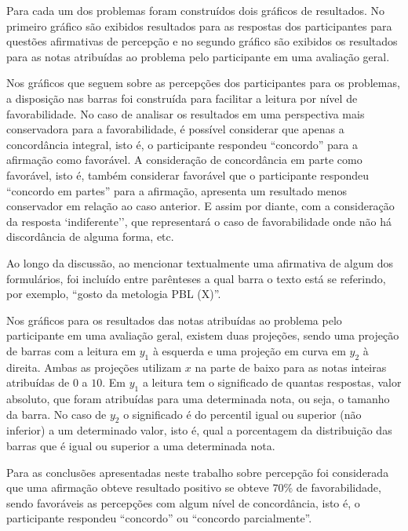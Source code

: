 


Para cada um dos problemas foram construídos dois gráficos de resultados.
No primeiro gráfico são exibidos resultados para as respostas
dos participantes para questões afirmativas de percepção e
no segundo gráfico são exibidos os resultados para as notas atribuídas
ao problema pelo participante em uma avaliação geral.

Nos gráficos que seguem sobre as percepções dos participantes para os
problemas, a disposição nas barras
foi construída para facilitar a leitura por nível de favorabilidade.
No caso de analisar os resultados em uma perspectiva mais conservadora
para a favorabilidade, é possível considerar que apenas a concordância
integral, isto é, o participante respondeu ``concordo'' para
a afirmação como favorável.
A consideração de concordância em parte como favorável,
isto é, também considerar favorável que
o participante respondeu ``concordo em partes'' para a afirmação,
apresenta um resultado menos conservador em relação ao caso anterior.
E assim por diante, com a consideração da resposta `indiferente'', que
representará o caso de favorabilidade onde não há discordância de alguma forma,
etc.

Ao longo da discussão, ao mencionar textualmente uma afirmativa de
algum dos formulários, foi incluído entre parênteses a qual barra o texto
está se referindo, por exemplo, ``gosto da metologia PBL (X)''.

Nos gráficos para os resultados das notas atribuídas
ao problema pelo participante em uma avaliação geral,
existem duas projeções, sendo uma projeção de barras com
a leitura em $y_1$ à esquerda e uma projeção em curva
em $y_2$ à direita.
Ambas as projeções utilizam $x$ na parte de baixo para as notas
inteiras atribuídas de $0$ a $10$.
Em $y_1$ a leitura tem o significado de quantas respostas, valor absoluto,
que foram atribuídas para uma determinada nota, ou seja,
o tamanho da barra.
No caso de $y_2$ o significado é do percentil igual ou superior
(não inferior) a um determinado valor, isto é,
qual a porcentagem da distribuição das barras que é igual ou superior
a uma determinada nota.

Para as conclusões apresentadas neste trabalho sobre percepção foi
considerada que uma afirmação obteve resultado positivo
se obteve $70\%$ de favorabilidade,
sendo favoráveis as percepções com algum nível de concordância,
isto é, o participante respondeu ``concordo''
ou ``concordo parcialmente''.

